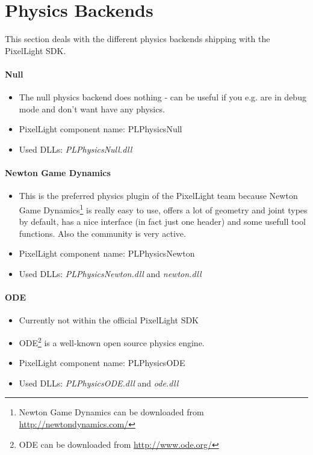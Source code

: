 \section{Physics Backends}
This section deals with the different physics backends shipping with the PixelLight \ac{SDK}.


\paragraph{Null}
\begin{itemize}
\item The null physics backend does nothing - can be useful if you e.g. are in debug mode and don't want have any physics.
\item PixelLight component name: PLPhysicsNull
\item Used \ac{DLL}s: \emph{PLPhysicsNull.dll}
\end{itemize}


\paragraph{Newton Game Dynamics}
\begin{itemize}
\item This is the preferred physics plugin of the PixelLight team because Newton Game Dynamics\footnote{Newton Game Dynamics can be downloaded from \url{http://newtondynamics.com/}} is really easy to use, offers a lot of geometry and joint types by default, has a nice interface (in fact just one header) and some usefull tool functions. Also the community is very active.
\item PixelLight component name: PLPhysicsNewton
\item Used \ac{DLL}s: \emph{PLPhysicsNewton.dll} and \emph{newton.dll}
\end{itemize}


\paragraph{\ac{ODE}}
\begin{itemize}
\item Currently not within the official PixelLight \ac{SDK}
\item \ac{ODE}\footnote{\ac{ODE} can be downloaded from \url{http://www.ode.org/}} is a well-known open source physics engine.
\item PixelLight component name: PLPhysicsODE
\item Used \ac{DLL}s: \emph{PLPhysicsODE.dll} and \emph{ode.dll}
\end{itemize}


